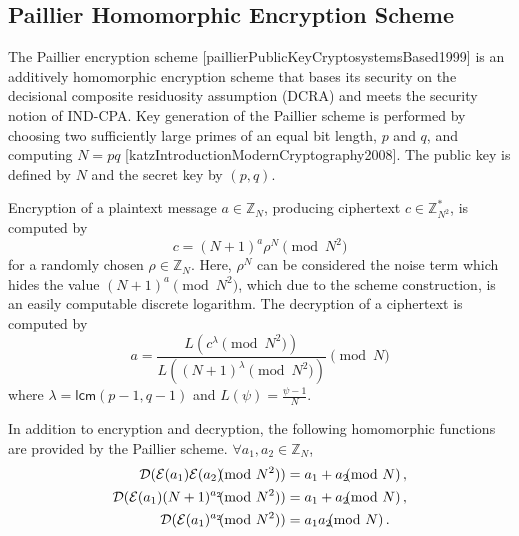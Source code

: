 \subsection{Paillier Homomorphic Encryption Scheme}\label{subsec:prelims:paillier}
The Paillier encryption scheme [paillierPublicKeyCryptosystemsBased1999] is an additively homomorphic encryption scheme that bases its security on the decisional composite residuosity assumption (DCRA) and meets the security notion of IND-CPA. Key generation of the Paillier scheme is performed by choosing two sufficiently large primes of an equal bit length, $p$ and $q$, and computing $N=pq$ [katzIntroductionModernCryptography2008]. The public key is defined by $N$ and the secret key by $(p, q)$.

Encryption of a plaintext message $a \in \mathbb{Z}_N$, producing ciphertext $c \in \mathbb{Z}^{*}_{N^2}$, is computed by
\begin{equation}
    c = (N+1)^a \rho^N \pmod{N^2}
\end{equation}
for a randomly chosen $\rho \in \mathbb{Z}_{N}$. Here, $\rho^N$ can be considered the noise term which hides the value $(N+1)^a \pmod{N^2}$, which due to the scheme construction, is an easily computable discrete logarithm. The decryption of a ciphertext is computed by
\begin{equation}
    a = \frac{L(c^\lambda\pmod{N^2})}{L((N+1)^\lambda\pmod{N^2})} \pmod{N}
\end{equation}
where $\lambda = \mathsf{lcm}(p-1, q-1)$ and $L(\psi) = \frac{\psi-1}{N}$.

In addition to encryption and decryption, the following homomorphic functions are provided by the Paillier scheme. $\forall a_1,a_2 \in \mathbb{Z}_N$,
\begin{align}
    \mathcal{D}(\mathcal{E}(a_1)\mathcal{E}(a_2) \hspace{-7pt} \pmod{N^2}) &= a_1+a_2 \hspace{-7pt} \pmod{N}\,, \label{eq:prelims:paillier_hom_add}\\
    \mathcal{D}(\mathcal{E}(a_1)(N+1)^{a_2} \hspace{-7pt} \pmod{N^2}) &= a_1+a_2\hspace{-7pt}\pmod{N}\,, \label{eq:prelims:paillier_hom_add_plain}\\
    \mathcal{D}(\mathcal{E}(a_1)^{a_2} \hspace{-7pt} \pmod{N^2}) &= a_1a_2 \hspace{-7pt} \pmod{N}\,. \label{eq:prelims:paillier_hom_mult}
\end{align}

